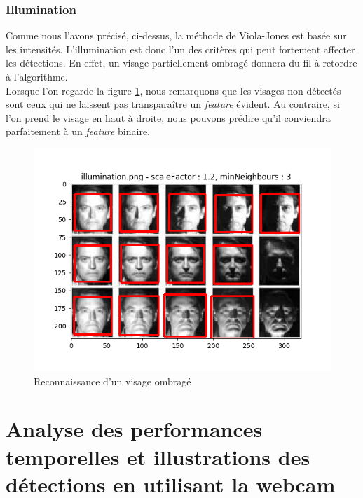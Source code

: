 \documentclass[a4paper,11pt]{article}
\begin{document}
	\subsubsection{Illumination}

	    Comme nous l'avons précisé, ci-dessus, la méthode de Viola-Jones est basée sur les
	    intensités. L'illumination est donc l'un des critères qui peut fortement affecter les
	    détections. En effet, un visage partiellement ombragé donnera du fil à retordre à
	    l'algorithme. \\

	    Lorsque l'on regarde la figure \ref{fig:illumination}, nous remarquons que les visages
	    non détectés sont ceux qui ne laissent pas transparaître un \textit{feature} évident. Au
	    contraire, si l'on prend le visage en haut à droite, nous pouvons prédire qu'il
	    conviendra parfaitement à un \textit{feature} binaire.


	    \begin{figure}[H]
	        \begin{center}
		   \includegraphics[scale = 0.6]{images/illumination_1,2_3.png}
		   \caption{Reconnaissance d'un visage ombragé}
		   \label{fig:illumination}
	        \end{center}
	    \end{figure}
	

\section{Analyse des performances temporelles et illustrations des détections en utilisant la webcam}
\end{document}
